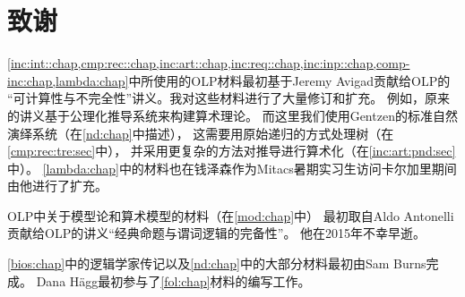 \section*{致谢}

\cref{inc:int::chap,cmp:rec::chap,inc:art::chap,inc:req::chap,inc:inp::chap,comp-inc:chap,lambda:chap}中所使用的OLP材料最初基于Jeremy Avigad贡献给OLP的
“可计算性与不完全性”讲义。我对这些材料进行了大量修订和扩充。
例如，原来的讲义基于公理化推导系统来构建算术理论。
而这里我们使用Gentzen的标准自然演绎系统（在\cref{nd:chap}中描述），
这需要用原始递归的方式处理树（在\cref{cmp:rec:tre:sec}中），
并采用更复杂的方法对推导进行算术化（在\cref{inc:art:pnd:sec}中）。
\cref{lambda:chap}中的材料也在钱泽森作为Mitacs暑期实习生访问卡尔加里期间由他进行了扩充。

OLP中关于模型论和算术模型的材料（在\cref{mod:chap}中）
最初取自Aldo Antonelli贡献给OLP的讲义“经典命题与谓词逻辑的完备性”。
他在2015年不幸早逝。

\cref{bios:chap}中的逻辑学家传记以及\cref{nd:chap}中的大部分材料最初由Sam Burns完成。
Dana Hägg最初参与了\cref{fol:chap}材料的编写工作。